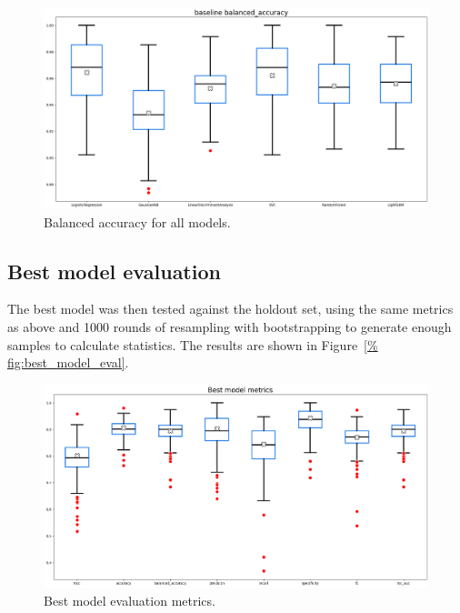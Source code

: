 \documentclass[12pt]{article}
\begin{document}
\begin{figure}[H]
    \centering
    \includegraphics[width=\textwidth]{ims/baseline_balanced_accuracy.png}
    \caption{Balanced accuracy for all models.}
    \label{fig:baseline_balanced_accuracy}
\end{figure}


\subsection{Best model evaluation}

The best model was then tested against the holdout set, using the same metrics
as above and 1000 rounds of resampling with bootstrapping to generate enough
samples to calculate statistics. The results are shown in Figure~\ref{%
fig:best_model_eval}.

\begin{figure}[H]
    \centering
    \includegraphics[width=\textwidth]{ims/best.png}
    \caption{Best model evaluation metrics.}
    \label{fig:best_model_eval}
\end{figure}
\end{document}

